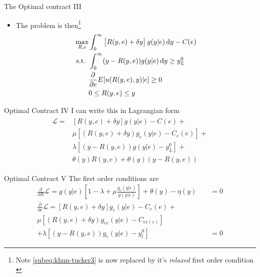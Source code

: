 \documentclass[compress]{beamer}
\begin{document}
\begin{frame}[c]{The Optimal contract III}
  \begin{itemize}
    \item The problem is then\footnote{Note \cref{subeq:khun-tucker3} is now replaced by it's \emph{relaxed} first order condition \parencite[see][for more details]{Rogerson1985FirstOrder}} 
          \begin{subequations}
            \label{eq:khun-tucker}
            \begin{align}
              \max_{R,e}   & \int_0^{\infty}\left[R(y,e)+\delta y\right]g(y|e)\dif y-C(e)\label{subeq:khun-tucker1} \\
              \text{s.t. } & \int_{0}^{\infty} (y-R(y,e))g(y|e)\dif y\geq y_L^0 \label{subeq:khun-tucker2}          \\
                           & \frac{\partial}{\partial e}E[u(R(y,e),y)|e]\geq 0 \label{subeq:khun-tucker3}           \\
                           & 0\leq R(y,e)\leq y \label{subeq:khun-tucker4}                                          
            \end{align}
          \end{subequations}
  \end{itemize}
\end{frame}

\begin{frame}[c]{Optimal Contract IV}
  I can write this in Lagrangian form
  \begin{align}
    \begin{split}
    \mathcal{L}  = & [R(y,e)+\delta y]g(y|e)-C(e)+                   \\ 
                   & \mu [(R(y,e)+\delta y)g_e(y|e)-C_e(e)]+         \\ 
                   & \lambda [(y-R(y,e))g(y|e)-y_L^0]+               \\
                   & \theta(y) R(y,e)+\theta(y)\left(y-R(y,e)\right) 
    \end{split}
  \end{align}
\end{frame}

\begin{frame}[c]{Optimal Contract V}
  The first order conditions are
  \begin{subequations}
    \label{eq:foc}
    \begin{align}
      \frac{\partial}{\partial R} \mathcal{L}=g(y|e)\left[1-\lambda+\mu \frac{g_e(y|e)}{g(y|e)}\right] +\theta(y)-\eta(y) & =0 \label{subeq:foc1} \\
      \frac{\partial}{\partial e} \mathcal{L}=[R(y,e)+\delta y]g_e(y|e)-C_e(e)+ \qquad \qquad \nonumber \\ 
      \mu\left[(R(y,e)+\delta y)g_{ee}(y|e)- C_{ee(e)}\right] \qquad                                                      & \nonumber             \\ 
      +\lambda\left[(y-R(y,e)) g_e(y|e)-y_l^0\right]                                                                      & =0 \label{subeq:foc2} 
    \end{align}
  \end{subequations}
\end{frame}
\end{document}

